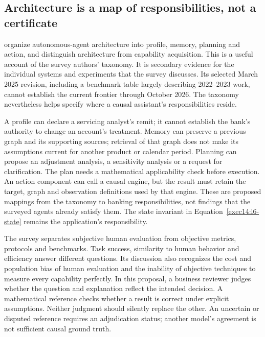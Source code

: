 \subsection{Architecture is a map of responsibilities, not a certificate}

\citet{exec18_framework_agents_survey} organize autonomous-agent architecture
into profile, memory, planning and action, and distinguish architecture from
capability acquisition. This is a useful account of the survey authors'
taxonomy. It is secondary evidence for the individual systems and experiments
that the survey discusses. Its selected March 2025 revision, including a
benchmark table largely describing 2022--2023 work, cannot establish the
current frontier through October 2026. The taxonomy nevertheless helps
specify where a causal assistant's responsibilities reside.

A profile can declare a servicing analyst's remit; it cannot establish the
bank's authority to change an account's treatment. Memory can preserve a
previous graph and its supporting sources; retrieval of that graph does not
make its assumptions current for another product or calendar period.
Planning can propose an adjustment analysis, a sensitivity analysis or a
request for clarification. The plan needs a mathematical applicability
check before execution. An action component can call a causal engine, but
the result must retain the target, graph and observation definitions used
by that engine. These are proposed mappings from the taxonomy to banking
responsibilities, not findings that the surveyed agents already satisfy
them. The state invariant in Equation~\ref{exec14:l6-state} remains the
application's responsibility.

The survey separates subjective human evaluation from objective metrics,
protocols and benchmarks. Task success, similarity to human behavior and
efficiency answer different questions. Its discussion also recognizes the
cost and population bias of human evaluation and the inability of objective
techniques to measure every capability perfectly. In this proposal, a
business reviewer judges whether the question and explanation reflect the
intended decision. A mathematical reference checks whether a result is
correct under explicit assumptions. Neither judgment should silently
replace the other. An uncertain or disputed reference requires an
adjudication status; another model's agreement is not sufficient causal
ground truth. \citep{exec18_framework_agents_survey}

